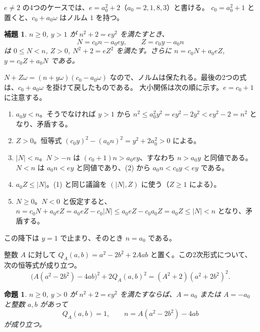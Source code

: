 \documentclass[a4paper,11pt]{ltjsarticle}
\makeatletter
\theoremstyle{jplain}
\newtheorem{proposition}[theorem]{命題}
\newtheorem{lemma}[theorem]{補題}
\renewcommand{\proofname}{証明}
\renewenvironment{proof}[1][\proofname]{\par\pushQED{\qed}\normalfont\topsep6\p@\@plus6\p@\relax
  \trivlist\item[\hskip\labelsep\bfseries #1]\ignorespaces}{\popQED\endtrivlist\@endpefalse}
\numberwithin{equation}{section}
\numberwithin{table}{section}
\makeatother
\begin{document}
$e\ne2$ の4つのケースでは、$e=a_0^2+2$（$a_0=2,1,8,3$）と書ける。
$c_0=a_0^2+1$ と置くと、$c_0+a_0\omega$ はノルム $1$ を持つ。

\begin{lemma}\label{lem:descent}
$n\ge0$, $y>1$ が $n^2+2=ey^2$ を満たすとき、
\[
N=c_0n-a_0ey,\qquad Z=c_0y-a_0n
\]
は $0\le N<n$, $Z>0$, $N^2+2=eZ^2$ を満たす。さらに $n=c_0N+a_0eZ$, $y=c_0Z+a_0N$ である。
\end{lemma}

\begin{proof}
$N+Z\omega=(n+y\omega)(c_0-a_0\omega)$ なので、ノルムは保たれる。最後の2つの式は、$c_0+a_0\omega$ を掛けて戻したものである。
大小関係は次の順に示す。$e=c_0+1$ に注意する。
\begin{enumerate}
\item $a_0y<n$。そうでなければ $y>1$ から $n^2\le a_0^2y^2=ey^2-2y^2<ey^2-2=n^2$ となり、矛盾する。
\item $Z>0$。恒等式 $(c_0y)^2-(a_0n)^2=y^2+2a_0^2>0$ による。
\item $|N|<n$。$N>-n$ は $(c_0+1)n>a_0ey$、すなわち $n>a_0y$ と同値である。$N<n$ は $a_0n<ey$ と同値であり、(2) から $a_0n<c_0y<ey$ である。
\item $a_0Z\le|N|$。(1) と同じ議論を $(|N|,Z)$ に使う（$Z\ge1$ による）。
\item $N\ge0$。$N<0$ と仮定すると、$n=c_0N+a_0eZ=a_0eZ-c_0|N|\le a_0eZ-c_0a_0Z=a_0Z\le|N|<n$ となり、矛盾する。
\end{enumerate}
\end{proof}

この降下は $y=1$ で止まり、そのとき $n=a_0$ である。

整数 $A$ に対して $Q_A(a,b)=a^2-2b^2+2Aab$ と置く。この2次形式について、次の恒等式が成り立つ。
\begin{equation}\label{eq:paramidentity}
\bigl(A(a^2-2b^2)-4ab\bigr)^2+2Q_A(a,b)^2=(A^2+2)(a^2+2b^2)^2.
\end{equation}

\begin{proposition}\label{prop:parameters}
$n\ge0$, $y>0$ が $n^2+2=ey^2$ を満たすならば、$A=a_0$ または $A=-a_0$ と整数 $a,b$ があって
\begin{equation}\label{eq:param}
Q_A(a,b)=1,\qquad n=A(a^2-2b^2)-4ab
\end{equation}
が成り立つ。
\end{proposition}
\end{document}
